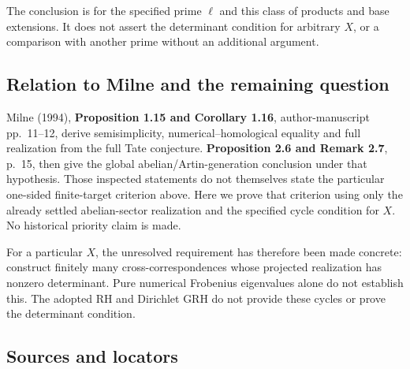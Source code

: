 \documentclass[11pt,a4paper]{article}
\theoremstyle{definition}\newtheorem{definition}[theorem]{Definition}
\theoremstyle{remark}\newtheorem{remark}[theorem]{Remark}
\begin{document}
The conclusion is for the specified prime \(\ell\) and this class of
products and base extensions. It does not assert the determinant
condition for arbitrary \(X\), or a comparison with another prime
without an additional argument.

\subsection{Relation to Milne and the remaining
question}\label{relation-to-milne-and-the-remaining-question}

Milne (1994), \textbf{Proposition 1.15 and Corollary 1.16},
author-manuscript pp.~11--12, derive semisimplicity,
numerical--homological equality and full realization from the full Tate
conjecture. \textbf{Proposition 2.6 and Remark 2.7}, p.~15, then give
the global abelian/Artin-generation conclusion under that hypothesis.
Those inspected statements do not themselves state the particular
one-sided finite-target criterion above. Here we prove that criterion
using only the already settled abelian-sector realization and the
specified cycle condition for \(X\). No historical priority claim is
made.

For a particular \(X\), the unresolved requirement has therefore been
made concrete: construct finitely many cross-correspondences whose
projected realization has nonzero determinant. Pure numerical Frobenius
eigenvalues alone do not establish this. The adopted RH and Dirichlet
GRH do not provide these cycles or prove the determinant condition.

\subsection{Sources and locators}\label{sources-and-locators}
\end{document}
